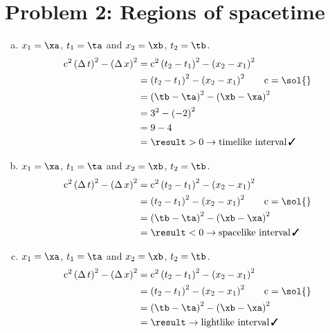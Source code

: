 \documentclass[pagesize,headsepline,10pt,parskip=half]{scrreprt}
\newcommand{\cmark}{\, \text{\ding{51}}}
\newcommand*\mdelta[1]{\ensuremath{\mathrm{\Delta\,}#1}}
\newcommand{\const}[1]{\mathrm{#1}}
\renewcommand{\c}{\const{c}}
\begin{document}
    \section{Problem 2: Regions of spacetime}
      \begin{enumerate}[(a)]
        \item $x_1 = \xa$, $t_1 = \ta$ and $x_2 = \xb$, $t_2 = \tb$.
          \spacetimeintv{\result}{\xa}{\ta}{\xb}{\tb}
          \begin{align*}
            \c^2 \, {(\mdelta{t})}^2 - {(\mdelta{x})}^2
              &= \c^2 \, {(t_2 - t_1)}^2 - {(x_2 - x_1)}^2\\
              &= {(t_2 - t_1)}^2 - {(x_2 - x_1)}^2 \qquad \c = \sol{}\\
              &= {(\tb - \ta)}^2 - {(\xb - \xa)}^2\\
              &= 3^2 - {(-2)}^2\\
              &= 9 - 4\\
              &= \result > 0 \rightarrow \text{timelike interval} \cmark
          \end{align*}

        \item $x_1 = \xa$, $t_1 = \ta$ and $x_2 = \xb$, $t_2 = \tb$.
          \spacetimeintv{\result}{\xa}{\ta}{\xb}{\tb}
          \begin{align*}
            \c^2 \, {(\mdelta{t})}^2 - {(\mdelta{x})}^2
              &= \c^2 \, {(t_2 - t_1)}^2 - {(x_2 - x_1)}^2\\
              &= {(t_2 - t_1)}^2 - {(x_2 - x_1)}^2 \qquad \c = \sol{}\\
              &= {(\tb - \ta)}^2 - {(\xb - \xa)}^2\\
              &= \result < 0 \rightarrow\text{spacelike interval} \cmark
          \end{align*}

        \item $x_1 = \xa$, $t_1 = \ta$ and $x_2 = \xb$, $t_2 = \tb$.
          \spacetimeintv{\result}{\xa}{\ta}{\xb}{\tb}
          \begin{align*}
            \c^2 \, {(\mdelta{t})}^2 - {(\mdelta{x})}^2
              &= \c^2 \, {(t_2 - t_1)}^2 - {(x_2 - x_1)}^2\\
              &= {(t_2 - t_1)}^2 - {(x_2 - x_1)}^2 \qquad \c = \sol{}\\
              &= {(\tb - \ta)}^2 - {(\xb - \xa)}^2\\
              &= \result \rightarrow \text{lightlike interval} \cmark
          \end{align*}


\end{enumerate}
\end{document}
